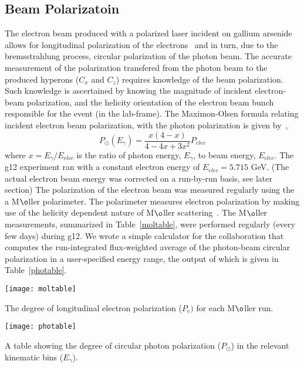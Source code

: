 \subsection{\label{sec:calib.pol}Beam Polarizatoin}
The electron beam produced with a polarized laser incident on gallium arsenide allows for longitudinal polarization of the electrons~\cite{polarizedelectrons} and in turn, due to the bremsstrahlung process, circular polarization of the photon beam.  The accurate measurement of the polarization transfered from the photon beam to the produced hyperons ($C_x$ and $C_z$) requires knowledge of the beam polarization.  Such knowledge is ascertained by knowing the magnitude of incident electron-beam polarization, and the helicity orientation of the electron beam bunch responsible for the event (in the lab-frame). The Maximon-Olsen formula relating incident electron beam polarization, with the photon polarization is given by~\cite{MaximonOlsen},
\begin{equation}
P_\odot(E_\gamma) = \frac{x(4-x)}{4 - 4x + 3x^2}P_{elec}
\end{equation}
where $x = E_\gamma /E_{elec}$ is the ratio of photon energy, $E_\gamma$, to beam energy, $E_{elec}$. The g12 experiment ran with a constant electron energy of $E_{elec} = 5.715$ GeV.  (The actual electron beam energy was corrected on a run-by-run basis, see later section) The polarization of the electron beam was measured regularly using the a M$\o$ller polarimeter.  The polarimeter measures electron polarization by making use of the helicity dependent nature of M$\o$ller scattering~\cite{Mecking,Carman}. The M$\o$ller measurements, summarized in Table~\ref{moltable}, were performed regularly (every few days) during g12.  We wrote a simple calculator for the collaboration that computes the run-integrated flux-weighted average of the photon-beam circular polarization in a user-specified energy range, the output of which is given in Table~\ref{photable}. 

\begin{table}[h]
  \centering
  \texttt{[image: moltable]}
  \caption{The degree of longitudinal electron polarization ($P_e)$ for each M$\o$ller run. }
  \label{moltable}
\end{table}

\begin{table}[h]
  \centering
  \texttt{[image: photable]}
  \caption{A table showing the degree of circular photon polarization ($P_\odot$) in the relevant kinematic bins ($E_\gamma$).}
  \label{photable}
\end{table}



